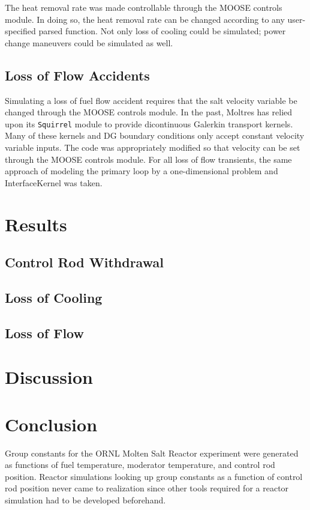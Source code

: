 The heat removal rate was made controllable through the MOOSE controls module. In doing so, the heat removal rate can be changed according to any user-specified parsed function. Not only loss of cooling could be simulated; power change maneuvers could be simulated as well.

\subsection{Loss of Flow Accidents}

Simulating a loss of fuel flow accident requires that the salt velocity variable be changed through the MOOSE controls module. In the past, Moltres \cite{moltres} has relied upon its \texttt{Squirrel} module to provide dicontinuous Galerkin transport kernels. Many of these kernels and DG boundary conditions only accept constant velocity variable inputs. The code was appropriately modified so that velocity can be set through the MOOSE controls module. For all loss of flow transients, the same approach of modeling the primary loop by a one-dimensional problem and InterfaceKernel was taken.

\section{Results}

\subsection{Control Rod Withdrawal}

\subsection{Loss of Cooling}

\subsection{Loss of Flow}

\section{Discussion}



\section{Conclusion}
Group constants for the ORNL Molten Salt Reactor experiment were generated as functions of fuel temperature, moderator temperature, and control rod position. Reactor simulations looking up group constants as a function of control rod position never came to realization since other tools required for a reactor simulation had to be developed beforehand.

